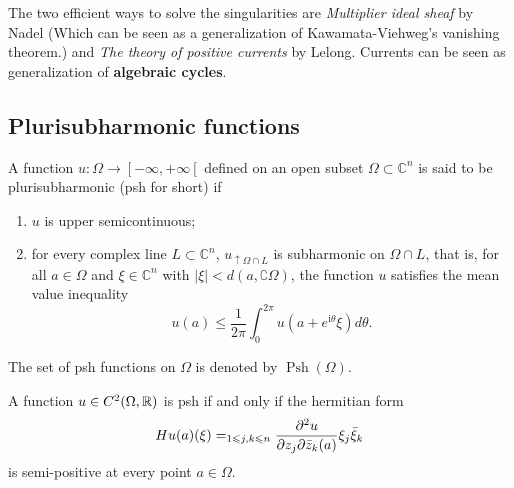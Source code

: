 \documentclass[lang=en,12pt,twoside]{textbook}
\let\sum\relax
\begin{document}
The two efficient ways to solve the singularities are \emph{Multiplier ideal sheaf} by Nadel (Which can be seen as a generalization of Kawamata-Viehweg's vanishing theorem.) and \emph{The theory of positive currents} by Lelong. Currents can be seen as generalization of \textbf{algebraic cycles}.

\subsection{Plurisubharmonic functions}
\begin{definition}\label{def:psh functions}
    A function $u: \Omega \longrightarrow\left[-\infty,+\infty\left[\right.\right.$ defined on an open subset $\Omega \subset \mathbb{C}^n$ is said to be plurisubharmonic (psh for short) if
    \begin{enumerate}[label=(\alph*)]
        \item $u$ is upper semicontinuous;
        \item for every complex line $L \subset \mathbb{C}^n$, $u_{\uparrow \Omega \cap L}$ is subharmonic on $\Omega \cap L$, that is, for all $a \in \Omega$ and $\xi \in \mathbb{C}^n$ with $|\xi|<d(a, \complement \Omega)$, the function $u$ satisfies the mean value inequality
$$
u(a) \leqslant \frac{1}{2 \pi} \int_0^{2 \pi} u\left(a+e^{\mathrm{i} \theta} \xi\right) d \theta.
$$
    \end{enumerate}
The set of psh functions on $\Omega$ is denoted by $\operatorname{Psh}(\Omega)$.
\end{definition}

\begin{theorem}[]\label{thm:psh-criterion}
    A function $u\in C^2(\Omega,{\mathbb R})$ is psh if and only if the hermitian form
    \begin{equation*}
        Hu(a)(\xi)=\sum_{1\leqslant j,k\leqslant n}\frac{\bd^2 u}{\bd z_j\bd\bar z_k(a)} \xi_j\bar\xi_k
    \end{equation*}
    is semi-positive at every point $a\in \Omega$.
\end{theorem}
\end{document}
